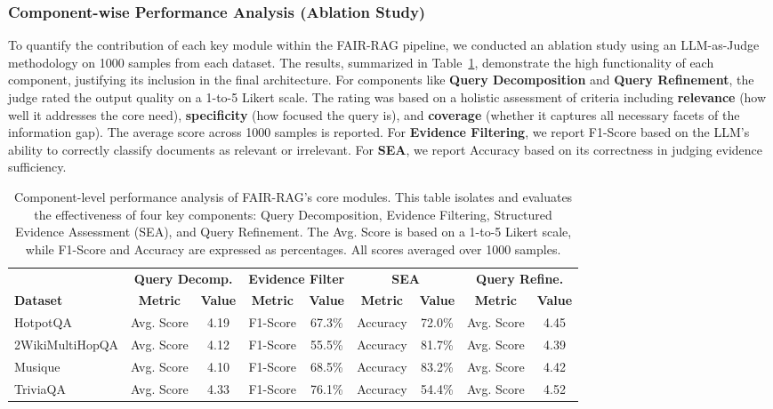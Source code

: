 \documentclass[11pt]{article}
\begin{document}
\subsubsection{Component-wise Performance Analysis (Ablation Study)}
\label{sec:ablation}

To quantify the contribution of each key module within the FAIR-RAG pipeline, we conducted an ablation study using an LLM-as-Judge methodology on 1000 samples from each dataset. The results, summarized in Table~\ref{tab:ablation}, demonstrate the high functionality of each component, justifying its inclusion in the final architecture. For components like \textbf{Query Decomposition} and \textbf{Query Refinement}, the judge rated the output quality on a 1-to-5 Likert scale. The rating was based on a holistic assessment of criteria including \textbf{relevance} (how well it addresses the core need), \textbf{specificity} (how focused the query is), and \textbf{coverage} (whether it captures all necessary facets of the information gap). The average score across 1000 samples is reported. For \textbf{Evidence Filtering}, we report F1-Score based on the LLM's ability to correctly classify documents as relevant or irrelevant. For \textbf{SEA}, we report Accuracy based on its correctness in judging evidence sufficiency.

\begin{table}[t]
\centering
\small
\setlength{\tabcolsep}{4pt}
\begin{tabular}{@{}lcccccccc@{}}
\hline
& \multicolumn{2}{c}{\textbf{Query Decomp.}} & \multicolumn{2}{c}{\textbf{Evidence Filter}} & \multicolumn{2}{c}{\textbf{SEA}} & \multicolumn{2}{c}{\textbf{Query Refine.}} \\
\cline{2-3} \cline{4-5} \cline{6-7} \cline{8-9}
\textbf{Dataset} & \textbf{Metric} & \textbf{Value} & \textbf{Metric} & \textbf{Value} & \textbf{Metric} & \textbf{Value} & \textbf{Metric} & \textbf{Value} \\
\hline
HotpotQA & Avg. Score & 4.19 & F1-Score & 67.3\% & Accuracy & 72.0\% & Avg. Score & 4.45 \\
2WikiMultiHopQA & Avg. Score & 4.12 & F1-Score & 55.5\% & Accuracy & 81.7\% & Avg. Score & 4.39 \\
Musique & Avg. Score & 4.10 & F1-Score & 68.5\% & Accuracy & 83.2\% & Avg. Score & 4.42 \\
TriviaQA & Avg. Score & 4.33 & F1-Score & 76.1\% & Accuracy & 54.4\% & Avg. Score & 4.52 \\
\hline
\end{tabular}
\caption{Component-level performance analysis of FAIR-RAG's core modules. This table isolates and evaluates the effectiveness of four key components: Query Decomposition, Evidence Filtering, Structured Evidence Assessment (SEA), and Query Refinement. The Avg. Score is based on a 1-to-5 Likert scale, while F1-Score and Accuracy are expressed as percentages. All scores averaged over 1000 samples.}
\label{tab:ablation}
\end{table}
\end{document}
